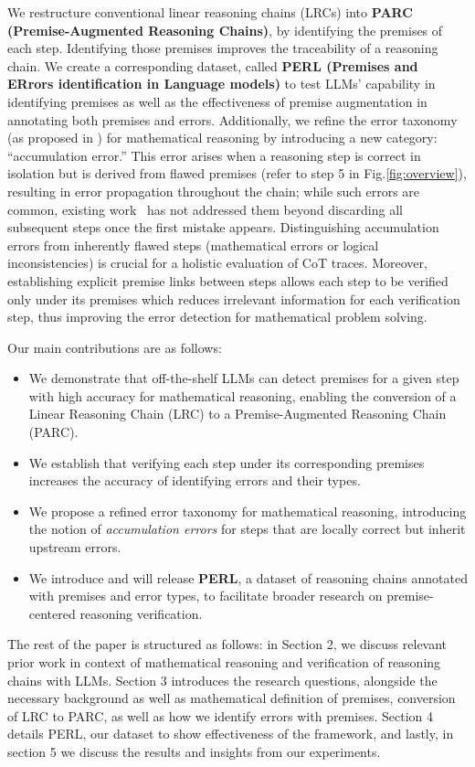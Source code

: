 We restructure conventional linear reasoning chains (LRCs) into \textbf{PARC (Premise-Augmented Reasoning Chains)}, by identifying the premises of each step. Identifying those premises improves the traceability of a reasoning chain. We create a corresponding dataset, called \textbf{PERL (Premises and ERrors identification in Language models)} to test LLMs' capability in identifying premises as well as the effectiveness of premise augmentation in annotating both premises and errors. Additionally, we refine the error taxonomy (as proposed in \cite{golovneva2023roscoesuitemetricsscoring}) for mathematical reasoning by introducing a new category: “accumulation error.” This error arises when a reasoning step is correct in isolation but is derived from flawed premises (refer to step 5 in Fig.\ref{fig:overview}), resulting in error propagation throughout the chain; while such errors are common, existing work~\cite{lightman2023letsverifystepstep, zheng2024processbenchidentifyingprocesserrors, daheim2024stepwiseverificationremediationstudent} has not addressed them beyond discarding all subsequent steps once the first mistake appears. Distinguishing accumulation errors from inherently flawed steps (mathematical errors or logical inconsistencies) is crucial for a holistic evaluation of CoT traces. Moreover, establishing explicit premise links between steps allows each step to be verified only under its premises which reduces irrelevant information for each verification step, thus improving the error detection for mathematical problem solving. 

Our main contributions are as follows:
\begin{itemize}
    \item We demonstrate that off-the-shelf LLMs can detect premises for a given step with high accuracy for mathematical reasoning, enabling the conversion of a Linear Reasoning Chain (LRC) to a Premise-Augmented Reasoning Chain (PARC).
    \item We establish that verifying each step under its corresponding premises increases the accuracy of identifying errors and their types.
    \item We propose a refined error taxonomy for mathematical reasoning, introducing the notion of \textit{accumulation errors} for steps that are locally correct but inherit upstream errors.
    \item We introduce and will release \textbf{PERL}, a dataset of reasoning chains annotated with premises and error types, to facilitate broader research on premise-centered reasoning verification.
\end{itemize}



The rest of the paper is structured as follows: in Section 2, we discuss relevant prior work in context of mathematical reasoning and verification of reasoning chains with LLMs. Section 3 introduces the research questions, alongside the necessary background as well as mathematical definition of premises, conversion of LRC to PARC, as well as how we identify errors with premises. Section 4 details PERL, our dataset to show effectiveness of the framework, and lastly, in section 5 we discuss the results and insights from our experiments.  